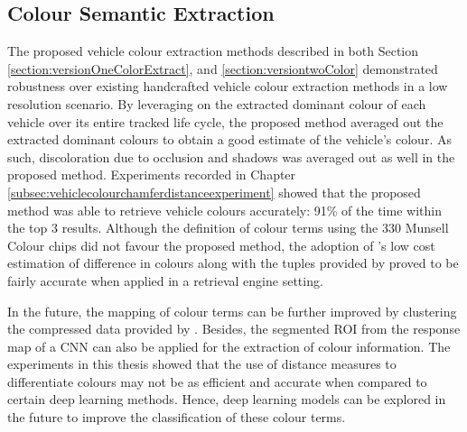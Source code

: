 \subsection*{Colour Semantic Extraction}
The proposed vehicle colour extraction methods described in both Section \ref{section:versionOneColorExtract}, and \ref{section:versiontwoColor} demonstrated robustness over existing handcrafted vehicle colour extraction methods in a low resolution scenario. By leveraging on the extracted dominant colour of each vehicle over its entire tracked life cycle, the proposed method averaged out the extracted dominant colours to obtain a good estimate of the vehicle's colour. As such, discoloration due to occlusion and shadows was averaged out as well in the proposed method. Experiments recorded in Chapter \ref{subsec:vehiclecolourchamferdistanceexperiment} showed that the proposed method was able to retrieve vehicle colours accurately: 91\% of the time within the top 3 results.   %
Although the definition of colour terms using the 330 Munsell Colour chips did not favour the proposed method, the adoption of \cite{riemersma}'s low cost estimation of difference in colours %
along with the tuples provided by \cite{munroe2010color} proved to be fairly accurate when applied in a retrieval engine setting.     

In the future, the mapping of colour terms can be further improved by clustering the compressed data provided by . Besides, the segmented ROI from the response map of a CNN can also be applied for the extraction of colour information. The experiments in this thesis showed that the use of distance measures to differentiate colours may not be as efficient and accurate when compared to certain deep learning methods. Hence, deep learning models can be explored in the future to improve the classification of these colour terms.

\vspace{1em}
